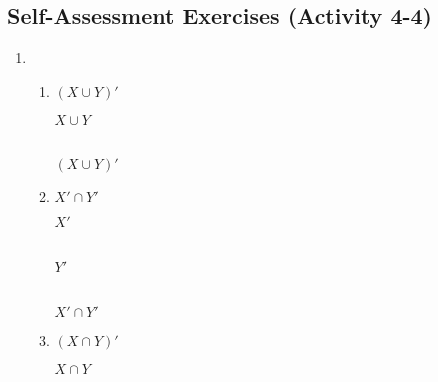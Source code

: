 \documentclass[../notes.tex]{subfiles}
\begin{document}
			\subsection{Self-Assessment Exercises (Activity 4-4)}
				\begin{enumerate}
					\item
						\begin{enumerate}
							\item $(X \cup Y)'$
								\begin{center}
									$X \cup Y$\\
									\begin{venndiagram2sets}[shade=circle area, labelA=$X$, labelB=$Y$]
										\fillA
										\fillB
									\end{venndiagram2sets}\\
									$(X \cup Y)'$\\
									\begin{venndiagram2sets}[shade=circle area, labelA=$X$, labelB=$Y$]
										\fillNotAorB
									\end{venndiagram2sets}
								\end{center}
							\pagebreak
							\item $X' \cap Y'$
								\begin{center}
									$X'$\\
									\begin{venndiagram2sets}[shade=circle area, labelA=$X$, labelB=$Y$]
										\fillNotA
									\end{venndiagram2sets}\\
									$Y'$\\
									\begin{venndiagram2sets}[shade=circle area, labelA=$X$, labelB=$Y$]
										\fillNotB
									\end{venndiagram2sets}\\
									$X' \cap Y'$\\
									\begin{venndiagram2sets}[shade=circle area, labelA=$X$, labelB=$Y$]
										\fillNotAorB
									\end{venndiagram2sets}
								\end{center}
							\item $(X \cap Y)'$
								\begin{center}
									$X \cap Y$\\
									\begin{venndiagram2sets}[shade=circle area, labelA=$X$, labelB=$Y$]
										\fillACapB

\end{venndiagram2sets}
\end{center}
\end{enumerate}
\end{enumerate}
\end{document}
